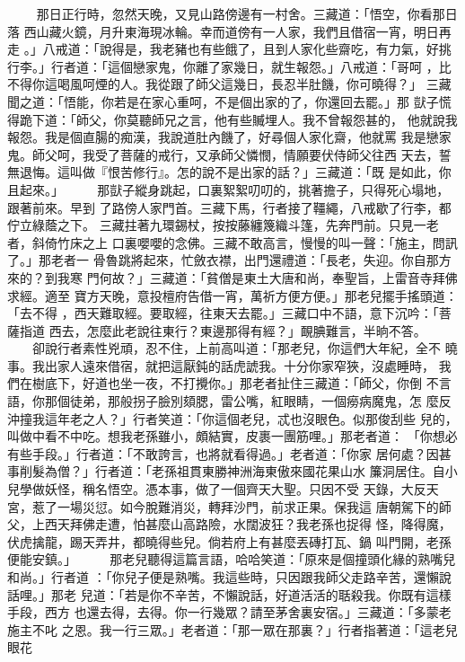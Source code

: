 \begin{pinyinscope}
{　　
那日正行時，忽然天晚，又見山路傍邊有一村舍。三藏道：「悟空，你看那日落
西山藏火鏡，月升東海現冰輪。幸而道傍有一人家，我們且借宿一宵，明日再走
。」八戒道：「說得是，我老豬也有些餓了，且到人家化些齋吃，有力氣，好挑
行李。」行者道：「這個戀家鬼，你離了家幾日，就生報怨。」八戒道：「哥呵
，比不得你這喝風呵煙的人。我從跟了師父這幾日，長忍半肚饑，你可曉得？」
三藏聞之道：「悟能，你若是在家心重呵，不是個出家的了，你還回去罷。」那
獃子慌得跪下道：「師父，你莫聽師兄之言，他有些贓埋人。我不曾報怨甚的，
他就說我報怨。我是個直腸的痴漢，我說道肚內饑了，好尋個人家化齋，他就罵
我是戀家鬼。師父呵，我受了菩薩的戒行，又承師父憐憫，情願要伏侍師父往西
天去，誓無退悔。這叫做『恨苦修行』。怎的說不是出家的話？」三藏道：「既
是如此，你且起來。」
　　
那獃子縱身跳起，口裏絮絮叨叨的，挑著擔子，只得死心塌地，跟著前來。早到
了路傍人家門首。三藏下馬，行者接了韁繩，八戒歇了行李，都佇立綠蔭之下。
三藏拄著九環錫杖，按按藤纏篾織斗篷，先奔門前。只見一老者，斜倚竹床之上
口裏嚶嚶的念佛。三藏不敢高言，慢慢的叫一聲：「施主，問訊了。」那老者一
骨魯跳將起來，忙斂衣襟，出門還禮道：「長老，失迎。你自那方來的？到我寒
門何故？」三藏道：「貧僧是東土大唐和尚，奉聖旨，上雷音寺拜佛求經。適至
寶方天晚，意投檀府告借一宵，萬祈方便方便。」那老兒擺手搖頭道：「去不得
，西天難取經。要取經，往東天去罷。」三藏口中不語，意下沉吟：「菩薩指道
西去，怎麼此老說往東行？東邊那得有經？」靦腆難言，半晌不答。
　　卻說行者素性兇頑，忍不住，上前高叫道：「那老兒，你這們大年紀，全不
曉事。我出家人遠來借宿，就把這厭鈍的話虎諕我。十分你家窄狹，沒處睡時，
我們在樹底下，好道也坐一夜，不打攪你。」那老者扯住三藏道：「師父，你倒
不言語，你那個徒弟，那般拐子臉別頦腮，雷公嘴，紅眼睛，一個癆病魔鬼，怎
麼反沖撞我這年老之人？」行者笑道：「你這個老兒，忒也沒眼色。似那俊刮些
兒的，叫做中看不中吃。想我老孫雖小，頗結實，皮裹一團筋哩。」那老者道：
「你想必有些手段。」行者道：「不敢誇言，也將就看得過。」老者道：「你家
居何處？因甚事削髮為僧？」行者道：「老孫祖貫東勝神洲海東傲來國花果山水
簾洞居住。自小兒學做妖怪，稱名悟空。憑本事，做了一個齊天大聖。只因不受
天錄，大反天宮，惹了一場災愆。如今脫難消災，轉拜沙門，前求正果。保我這
唐朝駕下的師父，上西天拜佛走遭，怕甚麼山高路險，水闊波狂？我老孫也捉得
怪，降得魔，伏虎擒龍，踢天弄井，都曉得些兒。倘若府上有甚麼丟磚打瓦、鍋
叫門開，老孫便能安鎮。」
　　
那老兒聽得這篇言語，哈哈笑道：「原來是個撞頭化緣的熟嘴兒和尚。」行者道
：「你兒子便是熟嘴。我這些時，只因跟我師父走路辛苦，還懶說話哩。」那老
兒道：「若是你不辛苦，不懶說話，好道活活的聒殺我。你既有這樣手段，西方
也還去得，去得。你一行幾眾？請至茅舍裏安宿。」三藏道：「多蒙老施主不叱
之恩。我一行三眾。」老者道：「那一眾在那裏？」行者指著道：「這老兒眼花
}
\end{pinyinscope}
